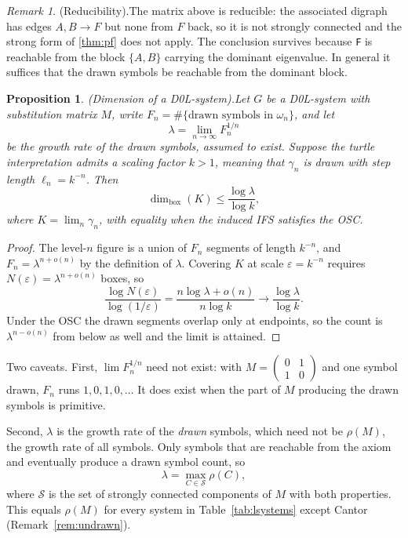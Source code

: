 \documentclass[11pt, a4paper]{article}
\theoremstyle{plain}
\newtheorem{proposition}[theorem]{Proposition}
\theoremstyle{definition}
\theoremstyle{remark}
\newtheorem{remark}[theorem]{Remark}
\newcommand{\Bd}{\dim_{\mathrm{box}}}    %
\newcommand{\eps}{\varepsilon}
\begin{document}
\begin{remark}{(Reducibility).}\label{rem:reducible}
    The matrix above is reducible: the associated digraph has edges
    $A,B\to F$ but none from $F$ back, so it is not strongly connected and the
    strong form of \ref{thm:pf} does not apply. The conclusion survives because
    \texttt{F} is reachable from the block $\{A,B\}$ carrying the dominant
    eigenvalue. In general it suffices that the drawn symbols be reachable from
    the dominant block.
\end{remark}

\begin{proposition}{(Dimension of a D0L-system).}\label{prop:d0l}
    Let $G$ be a D0L-system with substitution matrix $M$, write
    $F_n=\#\{\text{drawn symbols in }\omega_n\}$, and let
    \[
      \lambda=\lim_{n\to\infty}F_n^{1/n}
    \]
    be the growth rate of the drawn symbols, assumed to exist. Suppose the
    turtle interpretation
    admits a scaling factor $k>1$, meaning that $\gamma_n$ is drawn with step
    length $\ell_n=k^{-n}$. Then
    \[
    \Bd(K)\leq\frac{\log\lambda}{\log k},
    \]
    where $K=\lim_n\gamma_n$, with equality when the induced IFS satisfies the OSC.
\end{proposition}
\begin{proof}
    The level-$n$ figure is a union of $F_n$ segments of length $k^{-n}$, and $F_n=\lambda^{n+o(n)}$ by the definition of $\lambda$.
    Covering $K$ at scale $\eps=k^{-n}$ requires $N(\eps)=\lambda^{n+o(n)}$ boxes, so
    \[
    \frac{\log N(\eps)}{\log(1/\eps)}
      =\frac{n\log\lambda+o(n)}{n\log k}
      \longrightarrow\frac{\log\lambda}{\log k}.
    \]
    Under the OSC the drawn segments overlap only at endpoints, so the count is
    $\lambda^{n-o(n)}$ from below as well and the limit is attained.
\end{proof}

\noindent Two caveats. First, $\lim F_n^{1/n}$ need not exist: with
$M=\left(\begin{smallmatrix}0&1\\1&0\end{smallmatrix}\right)$ and one symbol
drawn, $F_n$ runs $1,0,1,0,\dots$ It does exist when the part of $M$ producing
the drawn symbols is primitive.

Second, $\lambda$ is the growth rate of the \emph{drawn} symbols, which need not
be $\rho(M)$, the growth rate of all symbols. Only symbols that are reachable
from the axiom and eventually produce a drawn symbol count, so
\[
  \lambda=\max_{C\in\mathcal{S}}\rho(C),
\]
where $\mathcal{S}$ is the set of strongly connected components of $M$ with
both properties. This equals $\rho(M)$ for every system in
Table~\ref{tab:lsystems} except Cantor (Remark~\ref{rem:undrawn}).
\end{document}
